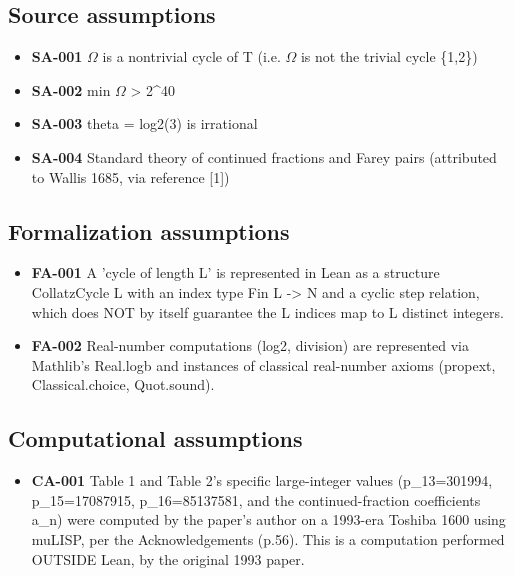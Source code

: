 \documentclass[11pt]{article}
\begin{document}
\subsection*{Source assumptions}
\begin{itemize}
\item \textbf{SA-001} \ensuremath{\Omega} is a nontrivial cycle of T (i.e. \ensuremath{\Omega} is not the trivial cycle \{1,2\})
\item \textbf{SA-002} min \ensuremath{\Omega} > 2\textasciicircum{}40
\item \textbf{SA-003} theta = log2(3) is irrational
\item \textbf{SA-004} Standard theory of continued fractions and Farey pairs (attributed to Wallis 1685, via reference [1])
\end{itemize}
\subsection*{Formalization assumptions}
\begin{itemize}
\item \textbf{FA-001} A 'cycle of length L' is represented in Lean as a structure CollatzCycle L with an index type Fin L -> N and a cyclic step relation, which does NOT by itself guarantee the L indices map to L distinct integers.
\item \textbf{FA-002} Real-number computations (log2, division) are represented via Mathlib's Real.logb and instances of classical real-number axioms (propext, Classical.choice, Quot.sound).
\end{itemize}
\subsection*{Computational assumptions}
\begin{itemize}
\item \textbf{CA-001} Table 1 and Table 2's specific large-integer values (p\_13=301994, p\_15=17087915, p\_16=85137581, and the continued-fraction coefficients a\_n) were computed by the paper's author on a 1993-era Toshiba 1600 using muLISP, per the Acknowledgements (p.56). This is a computation performed OUTSIDE Lean, by the original 1993 paper.
\end{itemize}
\end{document}
